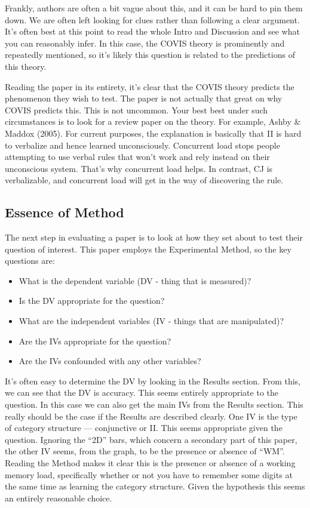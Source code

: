 \documentclass[12pt]{article}
\begin{document}
Frankly, authors are often a bit vague about this, and it can be hard
to pin them down. We are often left looking for clues rather than
following a clear argument. It's often best at this point to read the
whole Intro and Discussion and see what you can reasonably infer. In
this case, the COVIS theory is prominently and repeatedly mentioned,
so it's likely this question is related to the predictions of this
theory.

Reading the paper in its entirety, it's clear that the COVIS theory
predicts the phenomenon they wish to test. The paper is not actually
that great on why COVIS predicts this. This is not uncommon. Your best
best under such circumstances is to look for a review paper on the
theory. For example, Ashby \& Maddox (2005). For current purposes, the
explanation is basically that II is hard to verbalize and hence
learned unconsciously. Concurrent load stops people attempting to use
verbal rules that won't work and rely instead on their unconscious
system. That's why concurrent load helps. In contrast, CJ is
verbalizable, and concurrent load will get in the way of discovering
the rule.

\subsection{Essence of Method}

The next step in evaluating a paper is to look at how they set about
to test their question of interest. This paper employs the
Experimental Method, so the key questions are:

\begin{itemize}
	\item What is the dependent variable (DV - thing that is measured)? 
	\item Is the DV appropriate for the question?
	\item What are the independent variables (IV - things that are manipulated)?
	\item Are the IVs appropriate for the question?
	\item Are the IVs confounded with any other variables?
\end{itemize}

It's often easy to determine the DV by looking in the Results
section. From this, we can see that the DV is accuracy. This seems
entirely appropriate to the question. In this case we can also get the
main IVs from the Results section. This really should be the case if
the Results are described clearly.  One IV is the type of category
structure --- conjunctive or II. This seems appropriate given the
question. Ignoring the ``2D'' bars, which concern a secondary part of
this paper, the other IV seems, from the graph, to be the presence or
absence of ``WM''. Reading the Method makes it clear this is the
presence or absence of a working memory load, specifically whether or
not you have to remember some digits at the same time as learning the
category structure. Given the hypothesis this seems an entirely
reasonable choice.
\end{document}

